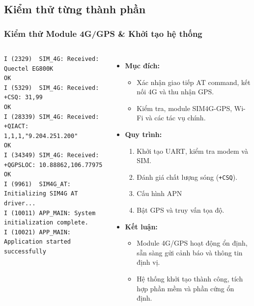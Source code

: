 
\subsection{Kiểm thử từng thành phần}

\begin{frame}[t,fragile]
\frametitle{Kiểm thử Module 4G/GPS \& Khởi tạo hệ thống}
\begin{columns}[T]
    \begin{verbatim}
I (2329)  SIM_4G: Received: Quectel EG800K
OK
I (5329)  SIM_4G: Received: +CSQ: 31,99
OK
I (28339) SIM_4G: Received: +QIACT: 1,1,1,"9.204.251.200"
OK
I (34349) SIM_4G: Received: +QGPSLOC: 10.88862,106.77975
OK
I (9961)  SIM4G_AT: Initializing SIM4G AT driver...
I (10011) APP_MAIN: System initialization complete.
I (10021) APP_MAIN: Application started successfully
    \end{verbatim}

    \begin{itemize}
        \item \textbf{Mục đích:} 
        \begin{itemize}
            \item Xác nhận giao tiếp AT command, kết nối 4G và thu nhận GPS.
            \item Kiểm tra, module SIM4G-GPS, Wi-Fi và các tác vụ chính.
        \end{itemize}
        \item \textbf{Quy trình:}
        \begin{enumerate}
            \item Khởi tạo UART, kiểm tra modem và SIM.
            \item Đánh giá chất lượng sóng (\texttt{+CSQ}).
            \item Cấu hình APN 
            \item Bật GPS và truy vấn tọa độ.
        \end{enumerate}
        \item \textbf{Kết luận:} 
        \begin{itemize}
            \item Module 4G/GPS hoạt động ổn định, sẵn sàng gửi cảnh báo và thông tin định vị.
            \item Hệ thống khởi tạo thành công, tích hợp phần mềm và phần cứng ổn định.
        \end{itemize}
    \end{itemize}
\end{columns}
\end{frame}


